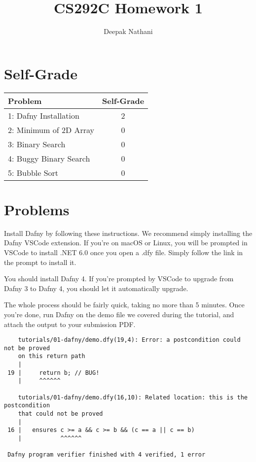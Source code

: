 \documentclass{jhwhw}
\author{Deepak Nathani}
\title{CS292C Homework 1}
\begin{document}
\maketitle

\section{Self-Grade}

\begin{table}[h]
    \centering
    \begin{tabular}{l|c}
        \toprule
        \midrule
        \textbf{Problem} & \textbf{Self-Grade} \\
        \midrule
        {1: Dafny Installation} & {2} \\
        \midrule
        {2: Minimum of 2D Array} & {0} \\
        \midrule
        {3: Binary Search} & {0} \\
        \midrule
        {4: Buggy Binary Search} & {0} \\
        \midrule
        {5: Bubble Sort} & {0} \\
        \midrule
        \bottomrule
    \end{tabular}
\end{table}

\section{Problems}
Install Dafny by following these instructions. We recommend simply installing the Dafny VSCode extension. If you're on macOS or Linux, you will be prompted in VSCode to install .NET 6.0 once you open a .dfy file. Simply follow the link in the prompt to install it.


You should install Dafny 4. If you're prompted by VSCode to upgrade from Dafny 3 to Dafny 4, you should let it automatically upgrade.


The whole process should be fairly quick, taking no more than 5 minutes.
Once you're done, run Dafny on the demo file we covered during the tutorial, and attach the output to your submission PDF.

\solution

\begin{verbatim}
    tutorials/01-dafny/demo.dfy(19,4): Error: a postcondition could not be proved 
    on this return path
    |
 19 |     return b; // BUG!
    |     ^^^^^^
 
    tutorials/01-dafny/demo.dfy(16,10): Related location: this is the postcondition 
    that could not be proved
    |
 16 |   ensures c >= a && c >= b && (c == a || c == b)
    |           ^^^^^^
 
 Dafny program verifier finished with 4 verified, 1 error
\end{verbatim}
\end{document}
